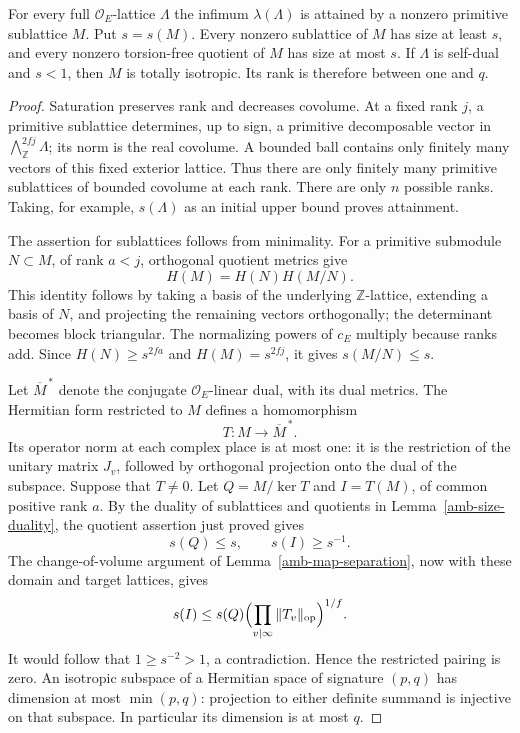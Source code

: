 \begin{lemma}\label{rv-minimum}
For every full $\mathcal O_E$-lattice $\Lambda$ the infimum
$\lambda(\Lambda)$ is attained by a nonzero primitive sublattice
$M$.  Put $s=s(M)$.  Every nonzero sublattice of $M$ has size
at least $s$, and every nonzero torsion-free quotient of $M$
has size at most $s$.
If $\Lambda$ is self-dual and $s<1$, then $M$ is totally
isotropic.  Its rank is therefore between one and $q$.
\end{lemma}
\begin{proof}
Saturation preserves rank and decreases covolume.  At a fixed
rank $j$, a primitive sublattice determines, up to sign, a
primitive decomposable vector in
$\bigwedge_{\mathbb Z}^{2fj}\Lambda$; its norm is the real
covolume.  A bounded ball contains only finitely many vectors
of this fixed exterior lattice.  Thus there are only finitely
many primitive sublattices of bounded covolume at each rank.
There are only $n$ possible ranks.  Taking, for example,
$s(\Lambda)$ as an initial upper bound proves attainment.

The assertion for sublattices follows from minimality.
For a primitive submodule $N\subset M$, of rank $a<j$,
orthogonal quotient metrics give
\[
                  H(M)=H(N)H(M/N).
\]
This identity follows by taking a basis of the underlying
$\mathbb Z$-lattice, extending a basis of $N$, and projecting
the remaining vectors orthogonally; the determinant becomes
block triangular.  The normalizing powers of $c_E$ multiply
because ranks add.  Since
$H(N)\ge s^{2fa}$ and $H(M)=s^{2fj}$, it gives
$s(M/N)\le s$.

Let $\overline{M}^{\,*}$ denote the conjugate
$\mathcal O_E$-linear dual, with its dual metrics.  The
Hermitian form restricted to $M$ defines a homomorphism
\[
                         T:M\longrightarrow\overline{M}^{\,*}.
\]
Its operator norm at each complex place is at most one:
it is the restriction of the unitary matrix $J_v$, followed
by orthogonal projection onto the dual of the subspace.
Suppose that $T\ne0$.  Let $Q=M/\ker T$ and $I=T(M)$, of
common positive rank $a$.  By the duality of sublattices and
quotients in Lemma~\ref{amb-size-duality}, the quotient
assertion just proved gives
\[
                 s(Q)\le s,\qquad s(I)\ge s^{-1}.
\]
The change-of-volume argument of
Lemma~\ref{amb-map-separation}, now with these domain and
target lattices, gives
\[
 s(I)\le s(Q)\Bigl(\prod_{v\mid\infty}
                                  \|T_v\|_{\rm op}\Bigr)^{1/f}.
\]
It would follow that $1\ge s^{-2}>1$, a contradiction.
Hence the restricted pairing is zero.  An isotropic subspace
of a Hermitian space of signature $(p,q)$ has dimension at
most $\min(p,q)$: projection to either definite summand is
injective on that subspace.  In particular its dimension
is at most $q$.
\end{proof}

